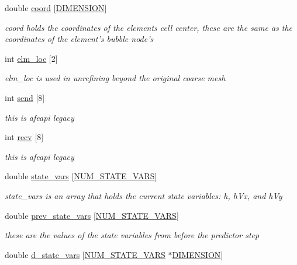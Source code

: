 \begin{CompactItemize}
double \hyperlink{classElement_r24}{coord} \mbox{[}\hyperlink{constant_8h_a15}{DIMENSION}\mbox{]}
\begin{CompactList}\small\item\em coord holds the coordinates of the elements cell center, these are the same as the coordinates of the element's bubble node's \item\end{CompactList}\item 
int \hyperlink{classElement_r25}{elm\_\-loc} \mbox{[}2\mbox{]}
\begin{CompactList}\small\item\em elm\_\-loc is used in unrefining beyond the original coarse mesh \item\end{CompactList}\item 
int \hyperlink{classElement_r26}{send} \mbox{[}8\mbox{]}
\begin{CompactList}\small\item\em this is afeapi legacy \item\end{CompactList}\item 
int \hyperlink{classElement_r27}{recv} \mbox{[}8\mbox{]}
\begin{CompactList}\small\item\em this is afeapi legacy \item\end{CompactList}\item 
double \hyperlink{classElement_r28}{state\_\-vars} \mbox{[}\hyperlink{constant_8h_a45}{NUM\_\-STATE\_\-VARS}\mbox{]}
\begin{CompactList}\small\item\em state\_\-vars is an array that holds the current state variables: h, h\-Vx, and h\-Vy \item\end{CompactList}\item 
double \hyperlink{classElement_r29}{prev\_\-state\_\-vars} \mbox{[}\hyperlink{constant_8h_a45}{NUM\_\-STATE\_\-VARS}\mbox{]}
\begin{CompactList}\small\item\em these are the values of the state variables from before the predictor step \item\end{CompactList}\item 
double \hyperlink{classElement_r30}{d\_\-state\_\-vars} \mbox{[}\hyperlink{constant_8h_a45}{NUM\_\-STATE\_\-VARS} $\ast$\hyperlink{constant_8h_a15}{DIMENSION}\mbox{]}

\end{CompactItemize}
